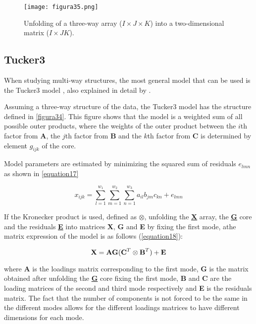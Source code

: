 \begin{figure}[hbtp]
\centering
\texttt{[image: figura35.png]}
\caption{Unfolding of a three-way array ($I \times J \times K$) into a two-dimensional matrix ($I \times JK$).}
\label{figura35}
\end{figure}


\subsection{Tucker3}
When studying multi-way structures, the most general model that can be used is the Tucker3 model \parencite{tucker1966some}, also explained in detail by \textcite{kiers2001three}.

Assuming a three-way structure of the data, the Tucker3 model has the structure defined in \autoref{figura34}. This figure shows that the model is a weighted sum of all possible outer products, where the weights of the outer product between the $i$th factor from \textbf{A}, the $j$th factor from \textbf{B} and the $k$th factor from \textbf{C} is determined by element $g_{ijk}$ of the core. 

Model parameters are estimated by minimizing the squared sum of residuals $e_{lmn}$ as shown in \autoref{equation17}

\begin{equation}
x_{ijk}=\sum\limits_{l=1}^{w_1} \sum\limits_{m=1}^{w_2} \sum\limits_{n=1}^{w_3}a_{il}b_{jm}c_{kn}+e_{lmn}
\label{equation17}
\end{equation}

If the Kronecker product is used, defined as $\otimes$, unfolding the \textbf{\underline{X}} array, the \textbf{\underline{G}} core and the residuals \textbf{\underline{E}} into matrices \textbf{X}, \textbf{G} and \textbf{E} by fixing the first mode, athe matrix expression of the model is as follows (\autoref{equation18}):

\begin{equation}
\textbf{\text{X}}=\textbf{\text{AG}}(\textbf{\text{C}}^T\otimes \textbf{\text{B}}^T)+\textbf{\text{E}}
\label{equation18}
\end{equation}

where \textbf{A} is the loadings matrix corresponding to the first mode, \textbf{G} is the matrix obtained after unfolding the \textbf{\underline{G}} core fixing the first mode, \textbf{B} and \textbf{C} are the loading matrices of the second and third mode respectively and \textbf{E} is the residuals matrix. The fact that the number of components is not forced to be the same in the different modes allows for the different loadings matrices to have different dimensions for each mode.

